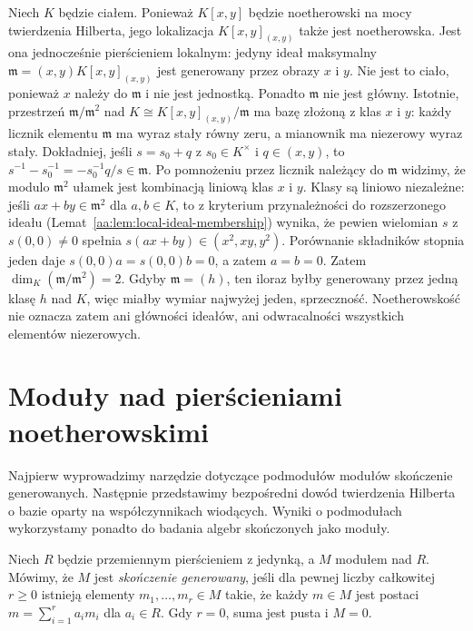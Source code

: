 \begin{przyklad}
\label{aa:prz:noether-local-ring}
Niech $K$ będzie ciałem. Ponieważ $K[x,y]$ będzie noetherowski na mocy twierdzenia
Hilberta, jego lokalizacja
$K[x,y]_{(x,y)}$ także jest noetherowska.
Jest ona jednocześnie pierścieniem lokalnym: jedyny ideał
maksymalny $\mathfrak m=(x,y)K[x,y]_{(x,y)}$ jest generowany
przez obrazy $x$ i $y$.
Nie jest to ciało, ponieważ $x$ należy do $\mathfrak m$
i nie jest jednostką. Ponadto $\mathfrak m$ nie jest główny.
Istotnie, przestrzeń $\mathfrak m/\mathfrak m^2$ nad
$K\cong K[x,y]_{(x,y)}/\mathfrak m$ ma bazę złożoną z klas
$x$ i $y$: każdy licznik elementu $\mathfrak m$ ma
wyraz stały równy zeru, a mianownik ma niezerowy wyraz
stały. Dokładniej, jeśli $s=s_0+q$ z $s_0\in K^\times$
i $q\in(x,y)$, to
$s^{-1}-s_0^{-1}=-s_0^{-1}q/s\in\mathfrak m$.
Po pomnożeniu przez licznik należący do $\mathfrak m$
widzimy, że modulo $\mathfrak m^2$ ułamek jest kombinacją
liniową klas $x$ i $y$. Klasy są liniowo niezależne:
jeśli $ax+by\in\mathfrak m^2$ dla $a,b\in K$, to z
kryterium przynależności do rozszerzonego ideału
(Lemat~\ref{aa:lem:local-ideal-membership}) wynika,
że pewien wielomian $s$ z $s(0,0)\ne0$ spełnia
$s(ax+by)\in(x^2,xy,y^2)$. Porównanie składników
stopnia jeden daje $s(0,0)a=s(0,0)b=0$, a zatem
$a=b=0$. Zatem
$\dim_K(\mathfrak m/\mathfrak m^2)=2$. Gdyby
$\mathfrak m=(h)$, ten iloraz byłby generowany przez
jedną klasę $h$ nad $K$, więc miałby wymiar najwyżej
jeden, sprzeczność. Noetherowskość nie oznacza zatem
ani główności ideałów, ani odwracalności wszystkich
elementów niezerowych.
\end{przyklad}

\section{Moduły nad pierścieniami noetherowskimi}
Najpierw wyprowadzimy narzędzie dotyczące podmodułów
modułów skończenie generowanych. Następnie przedstawimy
bezpośredni dowód twierdzenia Hilberta o bazie oparty na
współczynnikach wiodących. Wyniki o podmodułach wykorzystamy
ponadto do badania algebr skończonych jako moduły.

\begin{definicja}
\label{aa:def:noether-fg-module}
Niech $R$ będzie przemiennym pierścieniem z jedynką,
a $M$ modułem nad $R$. Mówimy, że $M$ jest
\emph{skończenie generowany}, jeśli dla pewnej liczby całkowitej
$r\ge0$ istnieją elementy $m_1,\ldots,m_r\in M$
takie, że każdy $m\in M$ jest
postaci $m=\sum_{i=1}^r a_im_i$ dla $a_i\in R$.
Gdy $r=0$, suma jest pusta i $M=0$.
\end{definicja}

